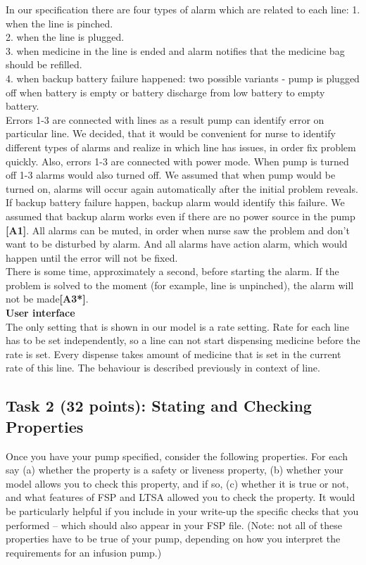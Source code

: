 \documentclass{article}
\newcommand{\head}{\subsection*}
\begin{document}
In our specification there are four types of alarm which are related to each line: 
1. when the line is pinched.\\
2. when the line is plugged.\\
3. when medicine in the line is ended and alarm notifies that the medicine bag should be refilled.\\
4. when backup battery failure happened: two possible variants - pump is plugged off when battery is empty or battery discharge from low battery to empty battery.\\
 Errors 1-3 are connected with lines as a result pump can identify error on particular line. We decided, that it would be convenient for nurse to identify different types of alarms and realize in which line has issues, in order fix problem quickly. Also, errors 1-3 are connected with power mode. When pump is turned off 1-3 alarms would also turned off. We assumed that when pump would be turned on, alarms will occur again automatically after the initial problem reveals. If backup battery failure happen, backup alarm would identify this failure. We assumed that backup alarm works even if there are no power source in the pump \textbf{[A1]}.
All alarms can be muted, in order when nurse saw the problem and don't want to be disturbed by alarm. And all alarms have action alarm, which would happen until the error will not be fixed.\\
There is some time, approximately a second, before starting the alarm. If the problem is solved to the moment (for example, line is unpinched), the alarm will not be made\textbf{[A3*]}.\\

\textbf{User interface} \\

The only setting that is shown in our model is a rate setting. Rate for each line has to be set independently, so a line can not start dispensing medicine before the rate is set. Every dispense takes amount of medicine that is set in the current rate of this line. The behaviour is described previously in context of line.




\head{Task 2 (32 points): Stating and Checking Properties}

Once you have your pump specified, consider the following properties. For each say (a) whether the property
is a safety or liveness property,  (b) whether your model allows you to check this property, and if
so, (c) whether it is true or not, and what features of FSP and LTSA allowed you to check the
property. It would be particularly helpful if you include in your write-up the specific checks that you performed -- which should also appear in your FSP file. (Note: not all of these properties have to be true of your pump, depending on how you interpret the requirements for an infusion pump.)
\end{document}
